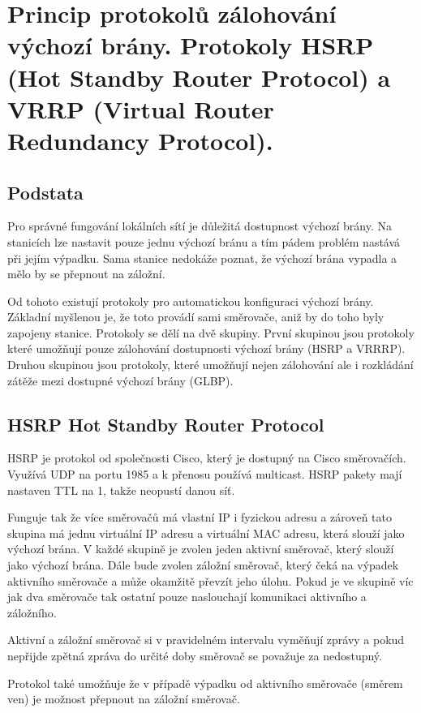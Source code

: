 \clearpage
\section{Princip protokolů zálohování výchozí brány. Protokoly HSRP (Hot Standby Router Protocol) a VRRP (Virtual Router Redundancy Protocol).}

\subsection{Podstata}

Pro správné fungování lokálních sítí je důležitá dostupnost výchozí brány.
Na stanicích lze nastavit pouze jednu výchozí bránu a tím pádem problém nastává při jejím výpadku.
Sama stanice nedokáže poznat, že výchozí brána vypadla a mělo by se přepnout na záložní.

Od tohoto existují protokoly pro automatickou konfiguraci výchozí brány.
Základní myšlenou je, že toto provádí sami směrovače, aniž by do toho byly zapojeny stanice.
Protokoly se dělí na dvě skupiny.
První skupinou jsou protokoly které umožňují pouze zálohování dostupnosti výchozí brány (HSRP a VRRRP).
Druhou skupinou jsou protokoly, které umožňují nejen zálohování ale i rozkládání zátěže mezi dostupné výchozí brány (GLBP).

\subsection{HSRP Hot Standby Router Protocol}

HSRP je protokol od společnosti Cisco, který je dostupný na Cisco směrovačích.
Využívá UDP na portu 1985 a k přenosu používá multicast.
HSRP pakety mají nastaven TTL na 1, takže neopustí danou síť.

Funguje tak že více směrovačů má vlastní IP i fyzickou adresu a zároveň tato skupina má jednu virtuální IP adresu a virtuální MAC adresu, která slouží jako výchozí brána.
V každé skupině je zvolen jeden aktivní směrovač, který slouží jako výchozí brána.
Dále bude zvolen záložní směrovač, který čeká na výpadek aktivního směrovače a může okamžitě převzít jeho úlohu.
Pokud je ve skupině víc jak dva směrovače tak ostatní pouze naslouchají komunikaci aktivního a záložního.

Aktivní a záložní směrovač si v pravidelném intervalu vyměňují zprávy a pokud nepřijde zpětná zpráva do určité doby směrovač se považuje za nedostupný.

Protokol také umožňuje že v případě výpadku od aktivního směrovače (směrem ven) je možnost přepnout na záložní směrovač.

